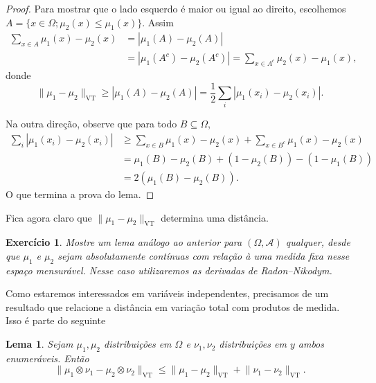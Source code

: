 \documentclass[reqno, draft]{book}
\newcommand*\1{\mathds{1}}
\newtheorem{lemma}[theorem]{Lema}
\newtheorem{exercise}[example]{Exercício}
\DeclareMathOperator{\VT}{VT}
\begin{document}
\begin{proof}
Para mostrar que o lado esquerdo é maior ou igual ao direito, escolhemos $A = \{ x \in \Omega; \mu_2(x) \leq \mu_1(x)\}$. Assim
\begin{equation}
  \begin{split}
    \sum_{x \in A} \mu_1(x) - \mu_2(x) & = |\mu_1(A) - \mu_2(A)|\\
    & = |\mu_1(A^c) - \mu_2(A^c)| = \sum_{x \in A^c} \mu_2(x) - \mu_1(x),
  \end{split}
\end{equation}
donde
\begin{equation}
  \lVert \mu_1 - \mu_2 \rVert_{\VT} \geq |\mu_1(A) - \mu_2(A)| = \frac{1}{2} \sum_{i} |\mu_1(x_i) - \mu_2(x_i)|.
\end{equation}

Na outra direção, observe que para todo $B \subseteq \Omega$,
\begin{equation}
  \begin{split}
    \sum_{i} |\mu_1(x_i) - \mu_2(x_i)| & \geq \sum_{x \in B} \mu_1(x) - \mu_2(x) + \sum_{x \in B^c} \mu_1(x) - \mu_2(x)\\
    & = \mu_1(B) - \mu_2(B) + (1 - \mu_2(B)) - (1 - \mu_1(B))\\
    & = 2(\mu_1(B) - \mu_2(B)).
  \end{split}
\end{equation}
O que termina a prova do lema.
\end{proof}

Fica agora claro que $\lVert \mu_1 - \mu_2 \rVert_{\VT}$ determina uma distância.

\begin{exercise}
Mostre um lema análogo ao anterior para $(\Omega, \mathcal{A})$ qualquer, desde que $\mu_1$ e $\mu_2$ sejam absolutamente contínuas com relação à uma medida fixa nesse espaço mensurável. Nesse caso utilizaremos as derivadas de Radon–Nikodym.
\end{exercise}

Como estaremos interessados em variáveis independentes, precisamos de um resultado que relacione a distância em variação total com produtos de medida. Isso é parte do seguinte

\begin{lemma}
\label{l:vt_produto}
Sejam $\mu_1, \mu_2$ distribuições em $\Omega$ e $\nu_1, \nu_2$ distribuições em $y$ ambos enumeráveis. Então
\begin{equation}
  \lVert \mu_1 \otimes \nu_1 - \mu_2 \otimes \nu_2 \rVert_{\VT} \leq \lVert \mu_1 - \mu_2 \rVert_{\VT} + \lVert \nu_1 - \nu_2 \rVert_{\VT}.
\end{equation}
\end{lemma}
\end{document}
